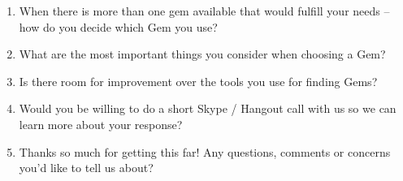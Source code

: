 \begin{enumerate}
  \item \hspace{1pt} When there is more than one gem available that would fulfill your needs -- how do you decide which Gem you use?

  \item \hspace{1pt} What are the most important things you consider when choosing a Gem?

  \item \hspace{1pt} Is there room for improvement over the tools you use for finding Gems?

  \item \hspace{1pt} Would you be willing to do a short Skype / Hangout call with us so we can learn more about your response?

  \item \hspace{1pt} Thanks so much for getting this far! Any questions, comments or concerns you'd like to tell us about?

\end{enumerate}

